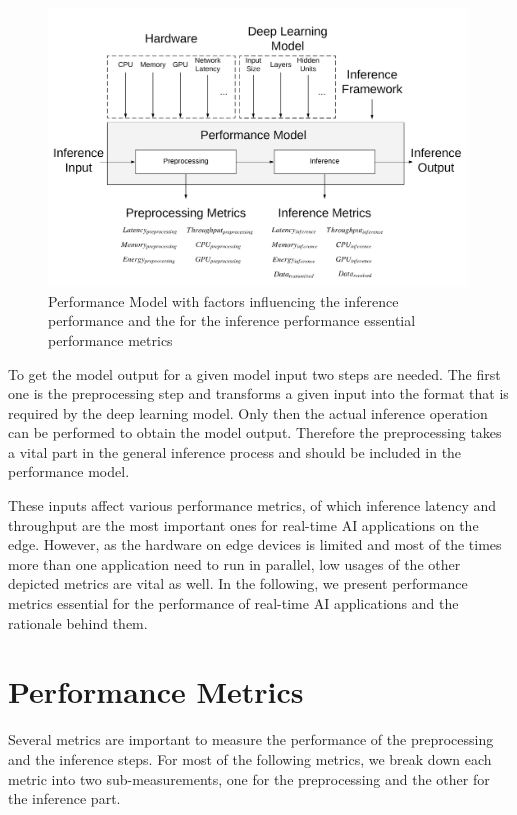 \begin{figure}[!htb]
\centering
\includegraphics[width=0.99\textwidth]{./Bilder/PerformanceModel.png}
\caption{Performance Model with factors influencing the inference performance and the for the inference performance essential performance metrics}
\label{fig:perfmodel}
\end{figure}

To get the model output for a given model input two steps are needed. The first one is the preprocessing step and transforms a given input into the format that is required by the deep learning model. Only then the actual inference operation can be performed to obtain the model output. Therefore the preprocessing takes a vital part in the general inference process and should be included in the performance model.

These inputs affect various performance metrics, of which inference latency and throughput are the most important ones for real-time AI applications on the edge. However, as the hardware on edge devices is limited and most of the times more than one application need to run in parallel, low usages of the other depicted metrics are vital as well.
In the following, we present performance metrics essential for the performance of real-time AI applications and the rationale behind them.







\section{Performance Metrics}
\label{chap:metrics}
Several metrics are important to measure the performance of the preprocessing and the inference steps. For most of the following metrics, we break down each metric into two sub-measurements, one for the preprocessing and the other for the inference part.

